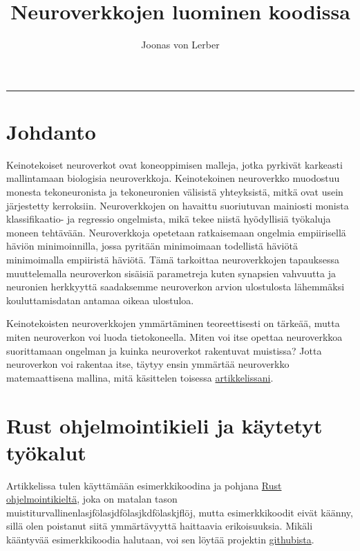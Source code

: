 \documentclass{article}
\author{Joonas von Lerber}
\title{Neuroverkkojen luominen koodissa}
\begin{document}
\maketitle

\tableofcontents

\vskip15pt
\hrule
\vskip15pt

\section{Johdanto}

Keinotekoiset neuroverkot ovat koneoppimisen malleja, jotka pyrkivät karkeasti mallintamaan biologisia neuroverkkoja.
Keinotekoinen neuroverkko muodostuu monesta tekoneuronista ja tekoneuronien välisistä yhteyksistä, mitkä ovat usein
järjestetty kerroksiin. Neuroverkkojen on havaittu suoriutuvan mainiosti monista klassifikaatio- ja regressio ongelmista,
mikä tekee niistä hyödyllisiä työkaluja moneen tehtävään. Neuroverkkoja opetetaan ratkaisemaan ongelmia empiirisellä
häviön minimoinnilla\cite{vapnik1999nature}, jossa pyritään minimoimaan todellistä häviötä minimoimalla empiiristä häviötä.
Tämä tarkoittaa neuroverkkojen tapauksessa muuttelemalla neuroverkon sisäisiä parametreja kuten synapsien vahvuutta ja neuronien
herkkyyttä saadaksemme neuroverkon arvion ulostulosta lähemmäksi kouluttamisdatan antamaa oikeaa ulostuloa.

Keinotekoisten neuroverkkojen ymmärtäminen teoreettisesti on tärkeää, mutta miten neuroverkon voi luoda tietokoneella.
Miten voi itse opettaa neuroverkkoa suorittamaan ongelman ja kuinka neuroverkot rakentuvat muistissa? %
Jotta neuroverkon voi rakentaa itse, täytyy ensin ymmärtää neuroverkko matemaattisena mallina, mitä käsittelen toisessa \href{http://example.com}{artikkelissani}. %

\section{Rust ohjelmointikieli ja käytetyt työkalut}

Artikkelissa tulen käyttämään esimerkkikoodina ja pohjana \href {https://www.rust-lang.org/}{Rust ohjelmointikieltä}, joka on matalan tason muistiturvallinenlasjfölasjdfölasjkdfölaskjflöj,%
mutta esimerkkikoodit eivät käänny, sillä olen poistanut siitä ymmärtävyyttä haittaavia erikoisuuksia. Mikäli kääntyvää esimerkkikoodia halutaan,
voi sen löytää projektin \href{https://github.com/Joonas-vonlerber/rusticneurons}{githubista}.
\end{document}
